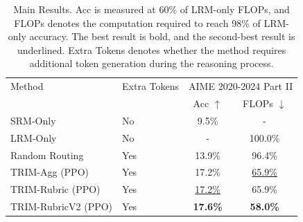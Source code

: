 \begin{table}[t]
\centering
\small
\begin{tabular}{llcc}
\toprule
Method & Extra Tokens & \multicolumn{2}{c}{AIME 2020-2024 Part II} &  \\
 &  & Acc $\uparrow$ & FLOPs $\downarrow$ \\
\midrule
SRM-Only & No & 9.5\% & - \\
LRM-Only & No & - & 100.0\% \\
Random Routing & Yes & 13.9\% & 96.4\% \\
TRIM-Agg (PPO) & Yes & 17.2\% & \underline{65.9\%} \\
TRIM-Rubric (PPO) & Yes & \underline{17.2\%} & 65.9\% \\
TRIM-RubricV2 (PPO) & Yes & \textbf{17.6\%} & \textbf{58.0\%} \\
\bottomrule
\end{tabular}
\caption{Main Results. Acc is measured at 60\% of LRM-only FLOPs, and FLOPs denotes the computation required to reach 98\% of LRM-only accuracy. The best result is bold, and the second-best result is underlined. Extra Tokens denotes whether the method requires additional token generation during the reasoning process.}
\end{table}
